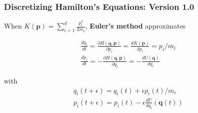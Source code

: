 \documentclass{beamer}
\begin{document}
\begin{frame}
\frametitle{Discretizing Hamilton's Equations: Version 1.0}

When $K(\mathbf{p})= \sum_{i=1}^d \frac{p_i^2}{2m_i}$, {\bf Euler's method} approximates

\begin{gather}
\frac{dq_i}{dt} = \frac{\partial H(\mathbf{q},\mathbf{p})}{\partial p_i} =  \frac{d K(\mathbf{p}) }{d p_i} = p_i/m_i  \\
\frac{dp_i}{dt} = -\frac{\partial H(\mathbf{q},\mathbf{p})}{\partial q_i} = -\frac{d U(\mathbf{q})}{d q_i} 
\end{gather}

with
\begin{gather}
q_i(t + \epsilon) =  q_i(t ) + \epsilon p_i(t)/m_i \\
p_i(t + \epsilon) =  p_i(t) - \epsilon \frac{d U}{d q_i}(\mathbf{q}(t))  
\end{gather}


\end{frame}
\end{document}
